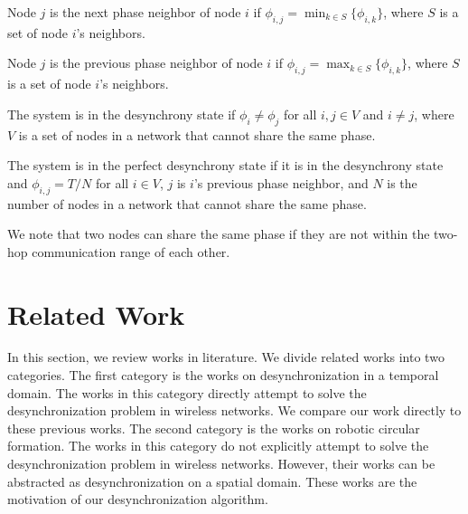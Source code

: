 \begin{defn}
Node $j$ is the next phase neighbor of node $i$ if $\phi_{i,j} = \min_{k \in S}\{\phi_{i,k}\}$, where $S$ is a set of node $i$'s neighbors. 
\end{defn}
\begin{defn}
Node $j$ is the previous phase neighbor of node $i$ if $\phi_{i,j} = \max_{k \in S}\{\phi_{i,k}\}$, where $S$ is a set of node $i$'s neighbors.
\end{defn}
\begin{defn}
The system is in the desynchrony state if $\phi_i \neq \phi_j$ for all $i, j \in V$ and  $i \neq j$, where $V$ is a set of nodes in a network that cannot share the same phase.
\end{defn}
\begin{defn}
The system is in the perfect desynchrony state if it is in the desynchrony state and $\phi_{i,j} = T/N$ for all $i \in V$, $j$ is $i$'s previous phase neighbor, and $N$ is the number of nodes in a network that cannot share the same phase.
\end{defn}

We note that two nodes can share the same phase if they are not within the two-hop communication range of each other.

\section{Related Work}
\label{sec:related}
In this section, we review works in literature. We divide related works into two categories.
The first category is the works on desynchronization in a temporal domain.
The works in this category directly attempt to solve the desynchronization problem in wireless networks.
We compare our work directly to these previous works.
The second category is the works on robotic circular formation. The works in this category do not explicitly attempt to solve the desynchronization problem in wireless networks. However, their works can be abstracted as desynchronization on a spatial domain. These works are the motivation of our desynchronization algorithm.

